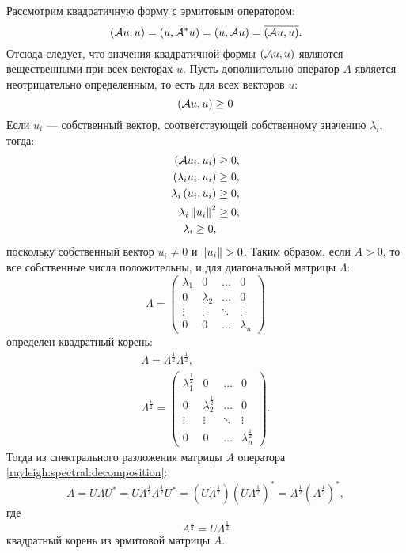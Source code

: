 Рассмотрим квадратичную форму с эрмитовым оператором:
\[
    \left ( \mathcal{A} u, u \right )
    = \left ( u, \mathcal{A}^* u \right )
    = \left ( u, \mathcal{A} u \right )
    = \overline{\left ( \mathcal{A} u, u \right )} .
\]
Отсюда следует, что значения квадратичной формы $\left ( \mathcal{A} u, u \right )$ являются вещественными при всех векторах $u$. Пусть дополнительно оператор $A$
является неотрицательно определенным, то есть для всех векторов $u$:
\[
    \left ( \mathcal{A} u, u \right ) \ge 0
\]
Если $u_i$ --- собственный вектор, соответствующей собственному значению $\lambda_i$, тогда:
\begin{align*}
    \left ( \mathcal{A} u_i, u_i \right ) & \ge 0 , \\
    \left ( \lambda_i u_i, u_i \right ) & \ge 0 , \\
    \lambda_i \left ( u_i, u_i \right ) & \ge 0 , \\
    \lambda_i \left \| u_i \right \|^2 & \ge 0 , \\
    \lambda_i \ge 0 ,
\end{align*}
поскольку собственный вектор $u_i \neq 0$ и $\left \| u_i \right \| > 0$. Таким образом, если $A > 0$, то все собственные числа положительны, и для диагональной
матрицы $\Lambda$:
\[
    \Lambda
    = \begin{pmatrix}
          \lambda_1 & 0         & \dots  & 0         \\
          0         & \lambda_2 & \dots  & 0         \\
          \vdots    & \vdots    & \ddots & \vdots    \\
          0         & 0         & \dots  & \lambda_n
    \end{pmatrix}
\]
определен квадратный корень:
\begin{gather*}
    \Lambda = \Lambda^{\frac{1}{2}} \Lambda^{\frac{1}{2}} , \\
    \Lambda^\frac{1}{2}
    = \begin{pmatrix}
          \lambda_1^\frac{1}{2} & 0                     & \dots  & 0                     \\
          0                     & \lambda_2^\frac{1}{2} & \dots  & 0                     \\
          \vdots                & \vdots                & \ddots & \vdots                \\
          0                     & 0                     & \dots  & \lambda_n^\frac{1}{2}
    \end{pmatrix}
    .
\end{gather*}
Тогда из спектрального разложения матрицы $A$ оператора \eqref{rayleigh:spectral:decomposition}:
\[
    A
    = U \Lambda U^*
    = U \Lambda^\frac{1}{2} \Lambda^\frac{1}{2} U^*
    = \left ( U \Lambda^\frac{1}{2} \right ) \left ( U \Lambda^\frac{1}{2} \right )^*
    = A^\frac{1}{2} \left ( A^\frac{1}{2} \right )^*,
\]
где
\[
    A^\frac{1}{2} = U \Lambda^\frac{1}{2}
\]
квадратный корень из эрмитовой матрицы $A$.

